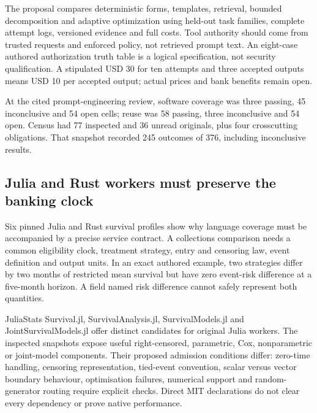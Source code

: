 The proposal compares deterministic forms, templates, retrieval, bounded
decomposition and adaptive optimization using held-out task families,
complete attempt logs, versioned evidence and full costs. Tool authority
should come from trusted requests and enforced policy, not retrieved
prompt text. An eight-case authored authorization truth table is a
logical specification, not security qualification. A stipulated USD 30
for ten attempts and three accepted outputs means USD 10 per accepted
output; actual prices and bank benefits remain open.
\citep{exec24_promptengineering_reference}

At the cited prompt-engineering review, software coverage was three
passing, 45 inconclusive and 54 open cells; reuse was 58 passing, three
inconclusive and 54 open. Census had 77 inspected and 36 unread
originals, plus four crosscutting obligations. That snapshot recorded
245 outcomes of 376, including inconclusive results.
\citep{sp24promptengineering_reader,sp24promptengineering_progress}

\hypertarget{julia-and-rust-workers-must-preserve-the-banking-clock}{%
\subsection{Julia and Rust workers must preserve the banking
clock}\label{julia-and-rust-workers-must-preserve-the-banking-clock}}

Six pinned Julia and Rust survival profiles show why language coverage
must be accompanied by a precise service contract. A collections
comparison needs a common eligibility clock, treatment strategy, entry
and censoring law, event definition and output units. In an exact
authored example, two strategies differ by two months of restricted mean
survival but have zero event-risk difference at a five-month horizon. A
field named risk difference cannot safely represent both quantities.
\citep{exec24_survivalother_reference}

JuliaStats Survival.jl, SurvivalAnalysis.jl, SurvivalModels.jl and
JointSurvivalModels.jl offer distinct candidates for original Julia
workers. The inspected snapshots expose useful right-censored,
parametric, Cox, nonparametric or joint-model components. Their proposed
admission conditions differ: zero-time handling, censoring
representation, tied-event convention, scalar versus vector boundary
behaviour, optimisation failures, numerical support and random-generator
routing require explicit checks. Direct MIT declarations do not clear
every dependency or prove native performance.
\citep{exec24_survivalother_juliastats,exec24_survivalother_juliaanalysis,exec24_survivalother_juliamodels,exec24_survivalother_juliajoint}

